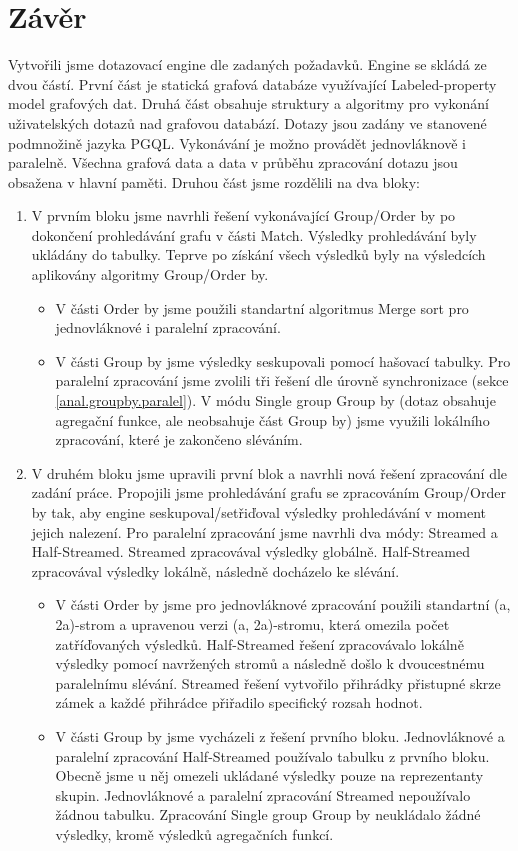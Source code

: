 \chapter{Závěr}

Vytvořili jsme dotazovací engine dle zadaných požadavků.
Engine se skládá ze dvou částí.
První část je statická grafová databáze využívající Labeled-property model grafových dat. 
Druhá část obsahuje struktury a algoritmy pro vykonání uživatelských dotazů nad grafovou databází.
Dotazy jsou zadány ve stanovené podmnožině jazyka PGQL.
Vykonávání je možno provádět jednovláknově i paralelně.
Všechna grafová data a data v průběhu zpracování dotazu jsou obsažena v hlavní paměti.
Druhou část jsme rozdělili na dva bloky:
\begin{enumerate}
\item
V prvním bloku jsme navrhli řešení vykonávající Group/Order by po dokončení prohledávání grafu v části Match.
Výsledky prohledávání byly ukládány do tabulky.
Teprve po získání všech výsledků byly na výsledcích aplikovány algoritmy Group/Order by.
\begin{itemize}
\item V části Order by jsme použili standartní algoritmus Merge sort pro jednovláknové i paralelní zpracování.
\item V části Group by jsme výsledky seskupovali pomocí hašovací tabulky.
Pro paralelní zpracování jsme zvolili tři řešení dle úrovně synchronizace (sekce \ref{anal.groupby.paralel}).
V módu Single group Group by (dotaz obsahuje agregační funkce, ale neobsahuje část Group by) jsme využili lokálního zpracování, které je zakončeno sléváním.
\end{itemize}

\item
V druhém bloku jsme upravili první blok a navrhli nová řešení zpracování dle zadání práce.
Propojili jsme prohledávání grafu se zpracováním Group/Order by tak, aby engine seskupoval/setřiďoval výsledky prohledávání v moment jejich nalezení.
Pro paralelní zpracování jsme navrhli dva módy: Streamed a Half-Streamed.
Streamed zpracovával výsledky globálně.
Half-Streamed zpracovával výsledky lokálně, následně docházelo ke slévání.
\begin{itemize}
\item V části Order by jsme pro jednovláknové zpracování použili standartní (a, 2a)-strom a upravenou verzi (a, 2a)-stromu, která omezila počet zatříďovaných výsledků.  
Half-Streamed řešení zpracovávalo lokálně výsledky pomocí navržených stromů a následně došlo k dvoucestnému paralelnímu slévání.
Streamed řešení vytvořilo přihrádky přistupné skrze zámek a každé přihrádce přiřadilo specifický rozsah hodnot.
\item
V části Group by jsme vycházeli z řešení prvního bloku.
Jednovláknové a paralelní zpracování Half-Streamed používalo tabulku z prvního bloku.
Obecně jsme u něj omezeli ukládané výsledky pouze na reprezentanty skupin.
Jednovláknové a paralelní zpracování Streamed nepoužívalo žádnou tabulku.
Zpracování Single group Group by neukládalo žádné výsledky, kromě výsledků agregačních funkcí.
\end{itemize}
\end{enumerate}

